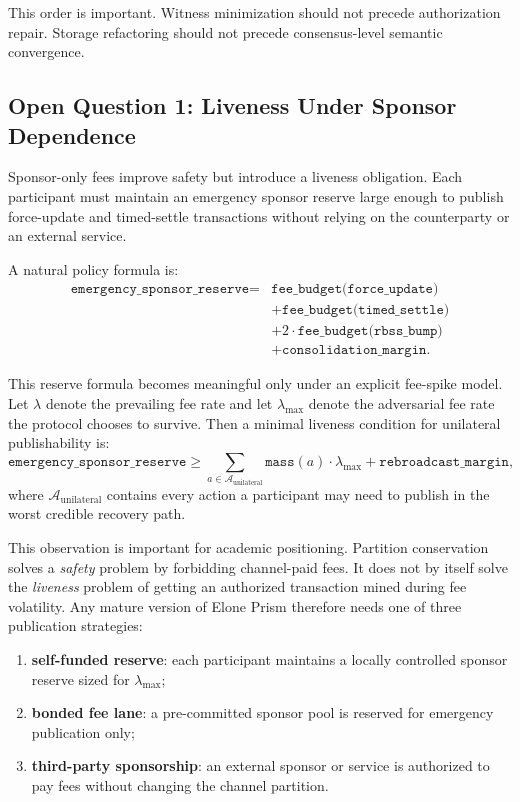 \documentclass[11pt,a4paper]{article}
\begin{document}
This order is important. Witness minimization should not precede authorization repair. Storage refactoring should not precede consensus-level semantic convergence.

\subsection{Open Question 1: Liveness Under Sponsor Dependence}

Sponsor-only fees improve safety but introduce a liveness obligation. Each participant must maintain an emergency sponsor reserve large enough to publish force-update and timed-settle transactions without relying on the counterparty or an external service.

A natural policy formula is:
\begin{align*}
\texttt{emergency\_sponsor\_reserve}
    ={}& \texttt{fee\_budget(force\_update)} \\
       &+ \texttt{fee\_budget(timed\_settle)} \\
       &+ 2 \cdot \texttt{fee\_budget(rbss\_bump)} \\
       &+ \texttt{consolidation\_margin}.
\end{align*}

This reserve formula becomes meaningful only under an explicit fee-spike model. Let $\lambda$ denote the prevailing fee rate and let $\lambda_{\max}$ denote the adversarial fee rate the protocol chooses to survive. Then a minimal liveness condition for unilateral publishability is:
\[
\texttt{emergency\_sponsor\_reserve} \geq \sum_{a \in \mathcal{A}_{\mathrm{unilateral}}} \texttt{mass}(a)\cdot \lambda_{\max} + \texttt{rebroadcast\_margin},
\]
where $\mathcal{A}_{\mathrm{unilateral}}$ contains every action a participant may need to publish in the worst credible recovery path.

This observation is important for academic positioning. Partition conservation solves a \emph{safety} problem by forbidding channel-paid fees. It does not by itself solve the \emph{liveness} problem of getting an authorized transaction mined during fee volatility. Any mature version of Elone Prism therefore needs one of three publication strategies:
\begin{enumerate}
    \item \textbf{self-funded reserve}: each participant maintains a locally controlled sponsor reserve sized for $\lambda_{\max}$;
    \item \textbf{bonded fee lane}: a pre-committed sponsor pool is reserved for emergency publication only;
    \item \textbf{third-party sponsorship}: an external sponsor or service is authorized to pay fees without changing the channel partition.
\end{enumerate}
\end{document}
